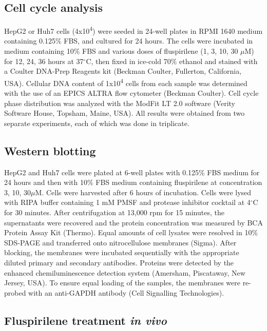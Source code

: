 \documentclass[10pt]{article}
\begin{document}
\subsection*{Cell cycle analysis}

HepG2 or Huh7 cells (4x10\textsuperscript{4}) were seeded in 24-well plates in RPMI 1640 medium containing 0.125\% FBS, and cultured for 24 hours. The cells were incubated in medium containing 10\% FBS and various doses of fluspirilene (1, 3, 10, 30 $\mu$M) for 12, 24, 36 hours at 37$^\circ$C, then fixed in ice-cold 70\% ethanol and stained with a Coulter DNA-Prep Reagents kit (Beckman Coulter, Fullerton, California, USA). Cellular DNA content of 1x10\textsuperscript{4} cells from each sample was determined with the use of an EPICS ALTRA flow cytometer (Beckman Coulter). Cell cycle phase distribution was analyzed with the ModFit LT 2.0 software (Verity Software House, Topsham, Maine, USA). All results were obtained from two separate experiments, each of which was done in triplicate.

\subsection*{Western blotting}

HepG2 and Huh7 cells were plated at 6-well plates with 0.125\% FBS medium for 24 hours and then with 10\% FBS medium containing fluspirilene at concentration 3, 10, 30$\mu$M. Cells were harvested after 6 hours of incubation. Cells were lysed with RIPA buffer containing 1 mM PMSF and protease inhibitor cocktail at 4$^\circ$C for 30 minutes. After centrifugation at 13,000 rpm for 15 minutes, the supernatants were recovered and the protein concentration was measured by BCA Protein Assay Kit (Thermo). Equal amounts of cell lysates were resolved in 10\% SDS-PAGE and transferred onto nitrocellulose membranes (Sigma). After blocking, the membranes were incubated sequentially with the appropriate diluted primary and secondary antibodies. Proteins were detected by the enhanced chemiluminescence detection system (Amersham, Piscataway, New Jersey, USA). To ensure equal loading of the samples, the membranes were re-probed with an anti-GAPDH antibody (Cell Signalling Technologies).

\subsection*{Fluspirilene treatment \textit{in vivo}}
\end{document}
